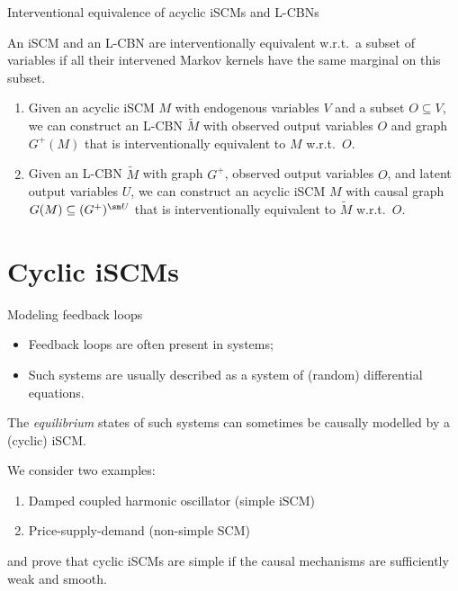 \begin{frame}{Interventional equivalence of acyclic iSCMs and L-CBNs}
  \begin{Def}
    An iSCM and an L-CBN are interventionally equivalent w.r.t.\ a subset of variables if all their intervened Markov kernels have the same marginal on this subset.
  \end{Def}
  \begin{Prp}[\ref{prp:interventional_equivalence_cbn_scm}]
  \begin{enumerate}
    \item Given an acyclic iSCM $M$ with endogenous variables $V$ and a subset $O \subseteq V$, we can construct an L-CBN $\tilde{M}$ with observed output variables $O$ and graph $G^+(M)$ that is interventionally equivalent to $M$ w.r.t.\ $O$.
    \item Given an L-CBN $\tilde{M}$ with graph $G^+$, observed output variables $O$, and latent output variables $U$, we can construct an acyclic iSCM $M$ with causal graph $G(M) \subseteq (G^+)^{\sm U}$ that is interventionally equivalent to $\tilde{M}$ w.r.t.\ $O$.
  \end{enumerate}
  \end{Prp}
\end{frame}

\part{Cyclic iSCMs}
\frame{\partpage}

\begin{frame}{Modeling feedback loops}
  \begin{itemize}
    \item Feedback loops are often present in systems;
    \item Such systems are usually described as a system of (random) differential equations.
  \end{itemize}

  \bigskip
The \emph{equilibrium} states of such systems can sometimes be causally modelled by a (cyclic) iSCM.

\bigskip
We consider two examples:
  \begin{enumerate}
    \item Damped coupled harmonic oscillator (simple iSCM)
    \item Price-supply-demand (non-simple SCM)
  \end{enumerate}
and prove that cyclic iSCMs are simple if the causal mechanisms are sufficiently weak and smooth.
\end{frame}

